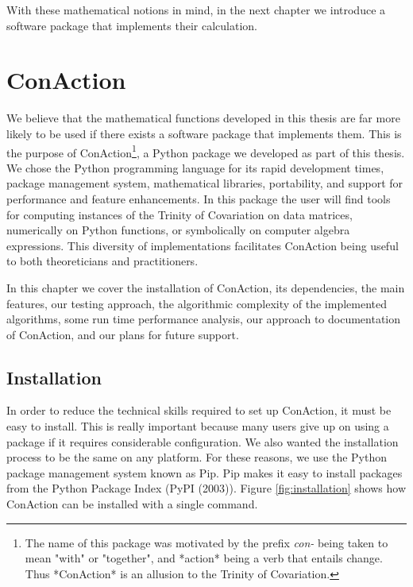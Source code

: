 \documentclass[
  letterpaper,
  DIV=11,
  numbers=noendperiod]{scrreprt}
\begin{document}
With these mathematical notions in mind, in the next chapter we
introduce a software package that implements their calculation.


\chapter{ConAction}\label{conaction}

We believe that the mathematical functions developed in this thesis are
far more likely to be used if there exists a software package that
implements them. This is the purpose of
ConAction\footnote{The name of this package was motivated by the prefix \textit{con-} being taken to mean "with" or "together", and *action* being a verb that entails change. Thus *ConAction* is an allusion to the Trinity of Covariation.},
a Python package we developed as part of this thesis. We chose the
Python programming language for its rapid development times, package
management system, mathematical libraries, portability, and support for
performance and feature enhancements. In this package the user will find
tools for computing instances of the Trinity of Covariation on data
matrices, numerically on Python functions, or symbolically on computer
algebra expressions. This diversity of implementations facilitates
ConAction being useful to both theoreticians and practitioners.

In this chapter we cover the installation of ConAction, its
dependencies, the main features, our testing approach, the algorithmic
complexity of the implemented algorithms, some run time performance
analysis, our approach to documentation of ConAction, and our plans for
future support.

\section{Installation}\label{installation}

In order to reduce the technical skills required to set up ConAction, it
must be easy to install. This is really important because many users
give up on using a package if it requires considerable configuration. We
also wanted the installation process to be the same on any platform. For
these reasons, we use the Python package management system known as Pip.
Pip makes it easy to install packages from the Python Package Index
(PyPI (2003)). Figure \ref{fig:installation} shows how ConAction can be
installed with a single command.
\end{document}
